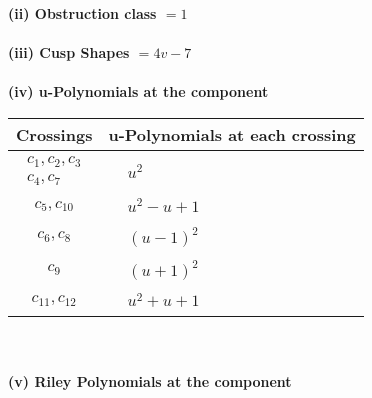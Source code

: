 \documentclass[1p]{elsarticle_modified}
\theoremstyle{definition}
\begin{document}
\flushleft \textbf{(ii) Obstruction class $= 1$}\\~\\
\flushleft \textbf{(iii) Cusp Shapes $= 4 v-7$}\\~\\
\newpage\renewcommand{\arraystretch}{1}
\flushleft \textbf{(iv) u-Polynomials at the component}\newline \\
\begin{tabular}{m{50pt}|m{274pt}}
Crossings & \hspace{64pt}u-Polynomials at each crossing \\
\hline $$\begin{aligned}c_{1},c_{2},c_{3}\\c_{4},c_{7}\end{aligned}$$&$\begin{aligned}
&u^2
\end{aligned}$\\
\hline $$\begin{aligned}c_{5},c_{10}\end{aligned}$$&$\begin{aligned}
&u^2- u+1
\end{aligned}$\\
\hline $$\begin{aligned}c_{6},c_{8}\end{aligned}$$&$\begin{aligned}
&(u-1)^2
\end{aligned}$\\
\hline $$\begin{aligned}c_{9}\end{aligned}$$&$\begin{aligned}
&(u+1)^2
\end{aligned}$\\
\hline $$\begin{aligned}c_{11},c_{12}\end{aligned}$$&$\begin{aligned}
&u^2+u+1
\end{aligned}$\\
\hline
\end{tabular}\\~\\
\newpage\renewcommand{\arraystretch}{1}
\flushleft \textbf{(v) Riley Polynomials at the component}\newline \\
\end{document}
